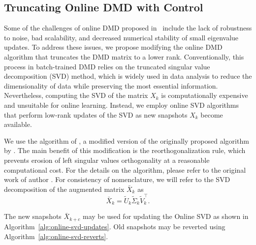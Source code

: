 \subsection{Truncating Online DMD with Control}\label{sec:truncating-online-dmd}
Some of the challenges of online DMD proposed in~\citet{Zhang2019} include the lack of robustness to noise, bad scalability, and decreased numerical stability of small eigenvalue updates. To address these issues, we propose modifying the online DMD algorithm that truncates the DMD matrix to a lower rank. Conventionally, this process in batch-trained DMD relies on the truncated singular value decomposition (SVD) method, which is widely used in data analysis to reduce the dimensionality of data while preserving the most essential information. Nevertheless, computing the SVD of the matrix \(X_k\) is computationally expensive and unsuitable for online learning. Instead, we employ online SVD algorithms that perform low-rank updates of the SVD as new snapshots \(X_k\) become available.

We use the algorithm of \citet{Zhang2022}, a modified version of the originally proposed algorithm by \citet{Brand2006}. The main benefit of this modification is the reorthogonalization rule, which prevents erosion of left singular values orthogonality at a reasonable computational cost. For the details on the algorithm, please refer to the original work of author \citep{Zhang2022}. For consistency of nomenclature, we will refer to the SVD decomposition of the augmented matrix \(\bar{X}_k\) as
\begin{equation*}
    \bar{X}_k = \tilde{U}_k \tilde{\Sigma}_k \tilde{V}_k^\top.
\end{equation*}

The new snapshots \(\bar{X}_{k+c}\) may be used for updating the Online SVD as shown in Algorithm~\ref{alg:online-svd-updates}. Old snapshots may be reverted using Algorithm~\ref{alg:online-svd-reverts}.

